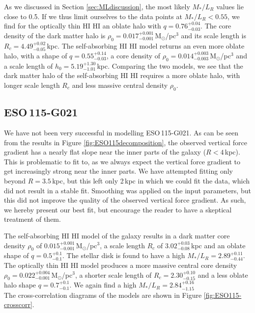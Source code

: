 \documentclass[useAMS,usenatbib]{mn2e}
\newcommand{\hi}{%
  \relax
  \ifmmode
    \textrm{\textsc{HI}}
  \else
    \textsc{H{\smaller}I}
  \fi
}
\begin{document}
As we discussed in Section \ref{sec:MLdiscussion}, the most likely 
$M_*/L_R$ values lie close to 0.5. If we thus limit ourselves to the 
data points at $M_*/L_R<0.55$, we find for the optically thin \hi an 
oblate halo with
$q =0.76_{-0.03}^{+0.04}$.
The core density of the dark matter halo is 
$\rho_0 = 0.017_{-0.001}^{+0.001}$\,M$_\odot$/pc$^3$ and its scale length is
$R_c = 4.49_{-0.05}^{+0.02}$\,kpc.
The self-absorbing \hi model returns an even more oblate halo, with a shape of 
$q =0.55_{-0.03}^{+0.14}$, a core density of 
$\rho_0 = 0.014_{-0.003}^{+0.003}$\,M$_\odot$/pc$^3$ and a scale length of 
$h_0 = 5.19_{-1.01}^{+1.30}$\,kpc.
Comparing the two models, we see that the dark matter halo of the 
self-absorbing \hi requires a more oblate halo, with longer scale 
length $R_c$ and less massive central density $\rho_0$.


\subsection{ESO\,115-G021}
We have not been very successful in modelling ESO\,115-G021.
As can be seen from the results in Figure \ref{fig:ESO115decomposition}, the 
observed vertical force gradient has a nearly flat slope near the inner parts 
of the galaxy ($R<4$\,kpc). 
This is problematic to fit to, as we always expect the vertical force gradient 
to get increasingly strong near the inner parts. 
We have attempted fitting only beyond $R=3.5$\,kpc, but this left only 2\,kpc 
in which we could fit the data, which did not result in a stable fit.
Smoothing was applied on the input parameters, but this did not improve the 
quality of the observed vertical force gradient.
As such, we hereby present our best fit, but encourage the reader to have a 
skeptical treatment of them.

The self-absorbing \hi model of the galaxy results in a dark matter core 
density $\rho_0$ of $0.015^{+0.001}_{-0.001}$\,M$_\odot$/pc$^3$, a scale length 
$R_c$ of $3.02^{+0.03}_{-0.08}$\,kpc and an oblate shape of $q=0.5^{+0.1}_{-0.1}$.
 The stellar disk is found to have a high $M_*/L_R=2.89^{+0.11}_{-0.44}$.
The optically thin \hi model produces a more massive central core density 
$\rho_0=0.022^{+0.004}_{-0.001}$\,M$_\odot$/pc$^3$, a shorter scale length of 
$R_c=2.30^{+0.10}_{-0.15}$ and a less oblate halo shape  $q=0.7^{+0.1}_{-0.1}$. 
We again find a high $M_*/L_R=2.84^{+0.16}_{-1.15}$\\
The cross-correlation diagrams of the models are shown in 
Figure \ref{fig:ESO115-crosscorr}.
\end{document}
